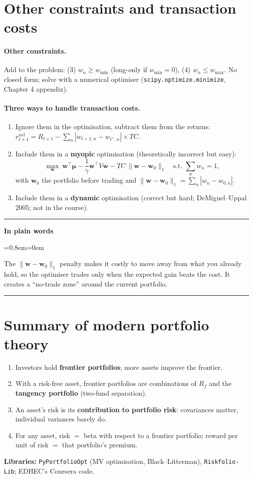 \documentclass[11pt,a4paper]{report}
\newenvironment{notebox}[1]
  {\par\medskip\Needspace{6\baselineskip}\noindent\rule{\linewidth}{0.4pt}\par\nopagebreak
   \noindent\textbf{#1}\par\nopagebreak
   \begin{list}{}{\leftmargin=0.8em\rightmargin=0em\topsep=2pt}\item[]}
  {\end{list}\nopagebreak\noindent\rule{\linewidth}{0.4pt}\par\medskip}
\newenvironment{plainbox}{\begin{notebox}{In plain words}}{\end{notebox}}
\newcommand{\w}{\bm{w}}
\newcommand{\T}{^{\top}}
\newcommand{\mub}{\bm{\mu}}
\begin{document}
\section{Other constraints and transaction costs}
\paragraph{Other constraints.} Add to the problem: (3) $w_n\ge w_{\min}$
(long-only if $w_{\min}=0$), (4) $w_n\le w_{\max}$. No closed form; solve with a
numerical optimiser (\texttt{scipy.optimize.minimize}, Chapter 4 appendix).

\paragraph{Three ways to handle transaction costs.}
\begin{enumerate}
  \item Ignore them in the optimisation, subtract them from the returns:
    $r^{net}_{t+1}=R_{t+1}-\sum_n|w_{t+1,n}-w_{t^+,n}|\times TC$.
  \item Include them in a \textbf{myopic} optimisation (theoretically incorrect but easy):
    \[ \max_{\w}\ \w\T\mub-\frac1\gamma\w\T V\w-TC\,\|\w-\w_0\|_1\quad\text{s.t. }\sum_n w_n=1, \]
    with $\w_0$ the portfolio before trading and $\|\w-\w_0\|_1=\sum_n|w_n-w_{0,n}|$.
  \item Include them in a \textbf{dynamic} optimisation (correct but hard;
    DeMiguel--Uppal 2005; not in the course).
\end{enumerate}
\begin{plainbox}
The $\|\w-\w_0\|_1$ penalty makes it costly to move away from what you already
hold, so the optimiser trades only when the expected gain beats the cost. It
creates a ``no-trade zone'' around the current portfolio.
\end{plainbox}

\section{Summary of modern portfolio theory}
\begin{enumerate}
  \item Investors hold \textbf{frontier portfolios}; more assets improve the frontier.
  \item With a risk-free asset, frontier portfolios are combinations of $R_f$ and
    the \textbf{tangency portfolio} (two-fund separation).
  \item An asset's risk is its \textbf{contribution to portfolio risk}: covariances
    matter, individual variances barely do.
  \item For any asset, risk $=$ beta with respect to a frontier portfolio; reward
    per unit of risk $=$ that portfolio's premium.
\end{enumerate}
\textbf{Libraries:} \texttt{PyPortfolioOpt} (MV optimisation, Black--Litterman),
\texttt{Riskfolio-Lib}; EDHEC's Coursera code.
\end{document}
